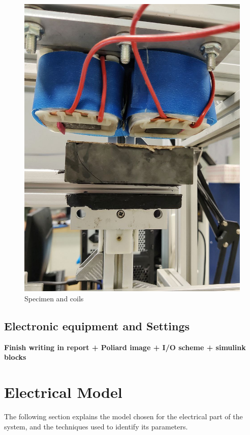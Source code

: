 \documentclass[a4paper, 11pt] {article}
\begin{document}
\begin{figure}
\begin{center}
\includegraphics[scale=0.2]{Images/1_magnete}
\end{center}
\caption{Specimen and coils}
\end{figure}


\subsection{Electronic equipment and Settings}

\textbf{Finish writing in report + Poliard image + I/O scheme + simulink blocks}



\section{Electrical Model}
The following section explains the model chosen for the electrical part of the system, and the techniques used to identify its parameters.
\end{document}
